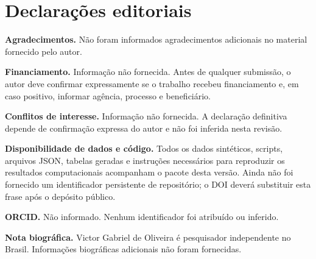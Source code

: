 \section*{Declarações editoriais}

\noindent\textbf{Agradecimentos.}
Não foram informados agradecimentos adicionais no material fornecido pelo
autor.

\medskip
\noindent\textbf{Financiamento.}
Informação não fornecida. Antes de qualquer submissão, o autor deve confirmar
expressamente se o trabalho recebeu financiamento e, em caso positivo,
informar agência, processo e beneficiário.

\medskip
\noindent\textbf{Conflitos de interesse.}
Informação não fornecida. A declaração definitiva depende de confirmação
expressa do autor e não foi inferida nesta revisão.

\medskip
\noindent\textbf{Disponibilidade de dados e código.}
Todos os dados sintéticos, scripts, arquivos JSON, tabelas geradas e instruções
necessários para reproduzir os resultados computacionais acompanham o pacote
desta versão. Ainda não foi fornecido um identificador persistente de
repositório; o DOI deverá substituir esta frase após o depósito público.

\medskip
\noindent\textbf{ORCID.}
Não informado. Nenhum identificador foi atribuído ou inferido.

\medskip
\noindent\textbf{Nota biográfica.}
Victor Gabriel de Oliveira é pesquisador independente no Brasil. Informações
biográficas adicionais não foram fornecidas.
